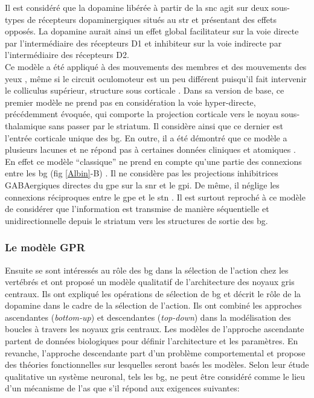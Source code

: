 Il est considéré que la dopamine libérée à partir de la \gls{snc} agit sur deux sous-types de récepteurs dopaminergiques situés au \gls{str} et présentant des effets opposés. La dopamine aurait ainsi un effet global facilitateur sur la voie directe par l'intermédiaire des récepteurs D1 et inhibiteur sur la voie indirecte par l'intermédiaire des récepteurs D2.\\

Ce modèle a été appliqué à des mouvements des membres \cite{Mink:1996} et des mouvements des yeux \cite{Hikosaka:1993}, même si le circuit oculomoteur est un peu différent puisqu'il fait intervenir le colliculus supérieur, structure sous corticale \cite{McHaffie:2005}. Dans sa version de base, ce premier modèle ne prend pas en considération la voie hyper-directe, précédemment évoquée, qui comporte la projection corticale vers le noyau sous-thalamique sans passer par le striatum. Il considère ainsi que ce dernier est l'entrée corticale unique des \gls{bg}. En outre, il a été démontré que ce modèle a plusieurs lacunes et ne répond pas à certaines données cliniques et atomiques \cite{Parent:1998}.\\

En effet ce modèle ``classique'' ne prend en compte qu'une partie des connexions entre les \gls{bg} (fig \ref{Albin}-B) \cite{Parent:1998,Parent:2001}. Il ne considère pas les projections inhibitrices GABAergiques directes du \gls{gpe} sur la \gls{snr} et le \gls{gpi}. De même, il néglige les connexions réciproques entre le \gls{gpe} et le \gls{stn} \cite{Shink:1996}. Il est surtout reproché à ce modèle de considérer que l'information est transmise de manière séquentielle et unidirectionnelle depuis le striatum vers les structures de sortie des \gls{bg}.\\

\subsubsection{Le mod\`ele GPR}

Ensuite \cite{Redgrave:1999} se sont intéressés au rôle des \gls{bg} dans la sélection de l'action chez les vertébrés et ont proposé un modèle qualitatif de l'architecture des noyaux gris centraux. Ils ont expliqué les opérations de sélection de \gls{bg} et décrit le rôle de la dopamine dans le cadre de la sélection de l'action. Ils ont combiné les approches ascendantes (\textit{bottom-up}) et descendantes (\textit{top-down}) dans la modélisation des boucles à travers les noyaux gris centraux. Les modèles de l'approche ascendante partent de données biologiques pour définir l'architecture et les paramètres. En revanche, l'approche descendante part d'un problème comportemental et propose des théories fonctionnelles sur lesquelles seront basés les modèles. Selon leur étude qualitative un système neuronal, tels les \gls{bg}, ne peut être considéré comme le lieu d'un mécanisme de l'\gls{as} que s'il répond aux exigences suivantes: \\

